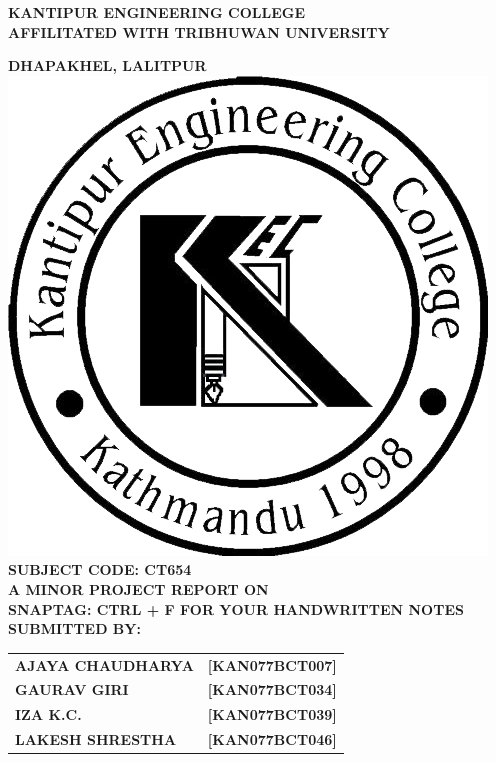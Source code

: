 \documentclass[a4paper,12pt]{report}
\begin{document}
\begin{titlepage}
\begin{center}

{\LARGE \uppercase{{\textbf{kantipur engineering college}}}}\\[0.4cm]	

{\Large \uppercase{\textbf{affilitated with tribhuwan university}} \\[1cm] }


{\Large \uppercase{\textbf{dhapakhel, lalitpur}}}\\[0.6cm]	
\includegraphics[scale=1.4]{logo.png}\\[0.6cm]

{\Large \uppercase{\textbf{SUBJECT CODE: CT654}}}\\[0.6cm]	

{\Large \uppercase{\textbf{a minor project report on}}}\\[0.6cm]	

{\large \uppercase{\textbf{snaptag: ctrl + f for your handwritten notes}}}\\[0.8cm]	

{\large \uppercase{\textbf{submitted by:}}}\\[0.8cm]	

\begin{tabular}{ll}
\large \uppercase{\textbf{ajaya chaudharya}} &\large \uppercase{\textbf{[kan077bct007]}} \\[0.6cm]
\Large \uppercase{\textbf{gaurav giri}} &\large \uppercase{\textbf{[kan077bct034]}}\\[0.6cm]	
\Large \uppercase{\textbf{iza k.c. }} &\large \uppercase{\textbf{[kan077bct039]}}\\[0.6cm]	
\Large \uppercase{\textbf{lakesh shrestha}} &\large \uppercase{\textbf{[kan077bct046]}}\\[0.8cm]	
\end{tabular}


\end{center}
\end{titlepage}
\end{document}
